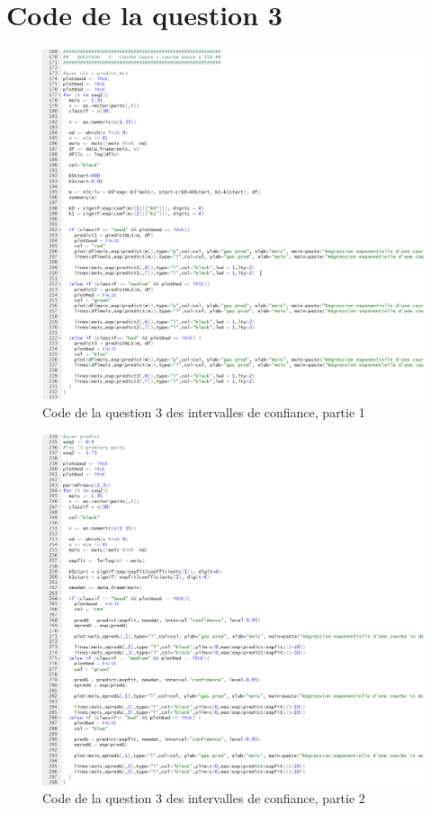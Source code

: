 \documentclass[12pt]{article}
\begin{document}
\section{Code de la question 3}
\begin{figure}[H]
 \centering %
	\includegraphics[width=600px]{code_q3_1}
  \caption{\label{fig:code_q3_1} Code de la question 3 des intervalles de confiance, partie 1}
\end{figure}
\begin{figure}[H]
 \centering %
	\includegraphics[width=600px]{code_q3_2}
  \caption{\label{fig:code_q3_2} Code de la question 3 des intervalles de confiance, partie 2}
\end{figure}
\end{document}
